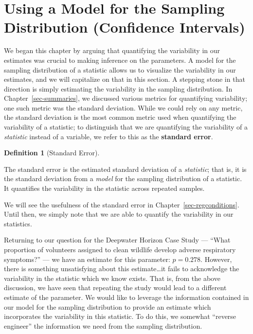 \documentclass[
  letterpaper,
  DIV=11,
  numbers=noendperiod]{scrreprt}
\theoremstyle{plain}
\theoremstyle{definition}
\theoremstyle{definition}
\newtheorem{definition}{Definition}[chapter]
\theoremstyle{remark}
\begin{document}
\section{Using a Model for the Sampling Distribution (Confidence
Intervals)}\label{using-a-model-for-the-sampling-distribution-confidence-intervals}

We began this chapter by arguing that quantifying the variability in our
estimates was crucial to making inference on the parameters. A model for
the sampling distribution of a statistic allows us to visualize the
variability in our estimates, and we will capitalize on that in this
section. A stepping stone in that direction is simply estimating the
variability in the sampling distribution. In
Chapter~\ref{sec-summaries}, we discussed various metrics for
quantifying variability; one such metric was the standard deviation.
While we could rely on any metric, the standard deviation is the most
common metric used when quantifying the variability of a statistic; to
distinguish that we are quantifying the variability of a
\emph{statistic} instead of a variable, we refer to this as the
\textbf{standard error}.

\begin{definition}[Standard
Error]\protect\hypertarget{def-standard-error}{}\label{def-standard-error}

The standard error is the estimated standard deviation of a
\emph{statistic}; that is, it is the standard deviation from a
\emph{model} for the sampling distribution of a statistic. It quantifies
the variability in the statistic across repeated samples.

\end{definition}

We will see the usefulness of the standard error in
Chapter~\ref{sec-regconditions}. Until then, we simply note that we are
able to quantify the variability in our statistics.

Returning to our question for the Deepwater Horizon Case Study ---
``What proportion of volunteers assigned to clean wildlife develop
adverse respiratory symptoms?'' --- we have an estimate for this
parameter: \(\widehat{p} = 0.278\). However, there is something
unsatisfying about this estimate\ldots it fails to acknowledge the
variability in the statistic which we know exists. That is, from the
above discussion, we have seen that repeating the study would lead to a
different estimate of the parameter. We would like to leverage the
information contained in our model for the sampling distribution to
provide an estimate which incorporates the variability in this
statistic. To do this, we somewhat ``reverse engineer'' the information
we need from the sampling distribution.
\end{document}
